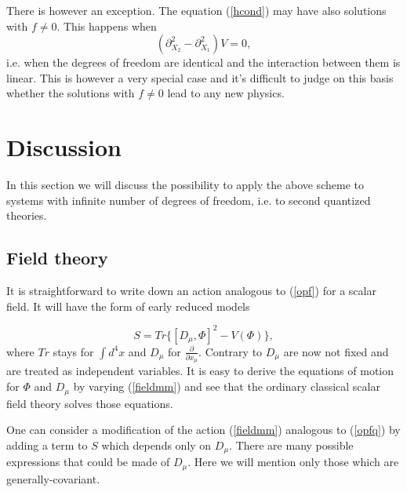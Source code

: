 \documentclass[a4paper,11pt]{article}
\begin{document}
There is however an exception. The equation (\ref{hcond}) may have
also solutions with $f\not=0$. This happens when
\begin{equation}
(\partial^2_{X_2}-\partial^2_{X_1})V=0,
\end{equation}
i.e. when the degrees of freedom are identical and the interaction
between them is linear. This is however a very special case and
it's difficult to judge on this basis whether the solutions with
$f\not=0$ lead to any new physics.



\section{Discussion}
\label{sec6} In this section we will discuss the possibility to
apply the above scheme to systems with infinite number of degrees
of freedom, i.e. to second quantized theories.

\subsection*{Field theory}
It is straightforward to write down an action analogous to
(\ref{opf}) for a scalar field. It will have the form of early
reduced models \cite{eguchikawai}

\begin{equation}
S=Tr \Big\{ [D_\mu,\Phi]^2 - V(\Phi) \Big\}, \label{fieldmm}
\end{equation}
where $Tr$ stays for $\int d^4 x$ and $D_\mu$ for
$\frac{\partial}{\partial x_\mu}$. Contrary to \cite{eguchikawai}
$D_\mu$ are now not fixed and are treated as independent
variables. It is easy to derive the equations of motion for $\Phi$
and $D_\mu$ by varying (\ref{fieldmm}) and see that the ordinary
classical scalar field theory solves those equations.

One can consider a modification of the action (\ref{fieldmm})
analogous to (\ref{opfq}) by adding a term to $S$ which depends
only on $D_\mu$. There are many possible expressions that could be
made of $D_\mu$. Here we will mention only those which are
generally-covariant.
\end{document}
